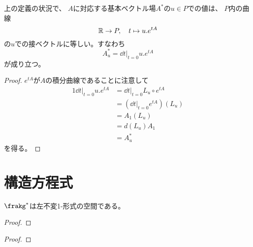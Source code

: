 \documentclass[report]{jlreq}
\begin{document}
\begin{proposition}[基本ベクトル場の幾何学的意味]
    上の定義の状況で、
    $A$に対応する基本ベクトル場$A^*$の$u \in P$での値は、
    $P$内の曲線
    \begin{equation}
        \mathbb{R} \to P, \quad
        t \mapsto u . e^{tA}
    \end{equation}
    の$u$での接ベクトルに等しい。すなわち
    \begin{equation}
        A^*_u = \dd{t}\Big|_{t = 0} u . e^{tA}
    \end{equation}
    が成り立つ。
\end{proposition}

\begin{proof}
    $e^{tA}$が$A$の積分曲線であることに注意して
    \begin{alignat}{1}
        \dd{t}\Big|_{t = 0} u . e^{tA}
            &= \dd{t}\Big|_{t = 0} L_u \circ e^{tA} \\
            &= \left(
                \dd{t}\Big|_{t = 0} e^{tA}
            \right) (L_u) \\
            &= A_1 (L_u) \\
            &= d(L_u) A_1 \\
            &= A^*_u
    \end{alignat}
    を得る。
\end{proof}


%
\section{構造方程式}


\begin{proposition}
    $\frakg^*$は左不変1-形式の空間である。
    \TODO{}
\end{proposition}

\begin{proof}
    \TODO{}
\end{proof}


\begin{proof}
    \TODO{}
\end{proof}
\end{document}
